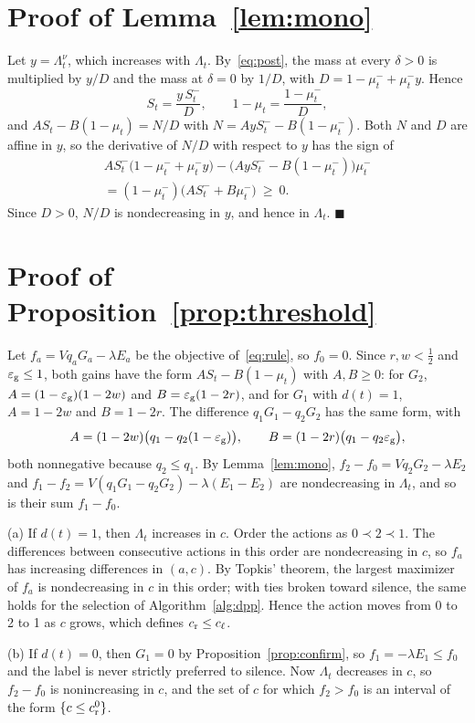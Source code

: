 \section{Proof of Lemma~\ref{lem:mono}}\label{app:mono}
Let $y=\Lambda_t^{\nu}$, which increases with $\Lambda_t$. By~\eqref{eq:post}, the mass at every $\delta>0$ is multiplied by $y/D$ and the mass at $\delta=0$ by $1/D$, with $D=1-\mu^-_t+\mu^-_ty$. Hence
\[
S_t=\frac{y\,S^-_t}{D},\qquad 1-\mu_t=\frac{1-\mu^-_t}{D},
\]
and $AS_t-B(1-\mu_t)=N/D$ with $N=AyS^-_t-B(1-\mu^-_t)$. Both $N$ and $D$ are affine in $y$, so the derivative of $N/D$ with respect to $y$ has the sign of
\begin{multline*}
AS^-_t\big(1-\mu^-_t+\mu^-_ty\big)-\big(AyS^-_t-B(1-\mu^-_t)\big)\mu^-_t\\
=(1-\mu^-_t)\big(AS^-_t+B\mu^-_t\big)\ \ge\ 0.
\end{multline*}
Since $D>0$, $N/D$ is nondecreasing in $y$, and hence in $\Lambda_t$. \hfill$\blacksquare$

\section{Proof of Proposition~\ref{prop:threshold}}\label{app:threshold}
Let $f_a=Vq_aG_a-\lambda E_a$ be the objective of~\eqref{eq:rule}, so $f_0=0$. Since $r,w<\frac12$ and $\varepsilon_{\rm g}\le1$, both gains have the form $AS_t-B(1-\mu_t)$ with $A,B\ge0$: for $G_2$, $A=(1-\varepsilon_{\rm g})(1-2w)$ and $B=\varepsilon_{\rm g}(1-2r)$, and for $G_1$ with $d(t)=1$, $A=1-2w$ and $B=1-2r$. The difference $q_1G_1-q_2G_2$ has the same form, with
\[
A=(1-2w)\big(q_1-q_2(1-\varepsilon_{\rm g})\big),\qquad B=(1-2r)\big(q_1-q_2\varepsilon_{\rm g}\big),
\]
both nonnegative because $q_2\le q_1$. By Lemma~\ref{lem:mono}, $f_2-f_0=Vq_2G_2-\lambda E_2$ and $f_1-f_2=V(q_1G_1-q_2G_2)-\lambda(E_1-E_2)$ are nondecreasing in $\Lambda_t$, and so is their sum $f_1-f_0$.

(a) If $d(t)=1$, then $\Lambda_t$ increases in $c$. Order the actions as $0\prec2\prec1$. The differences between consecutive actions in this order are nondecreasing in $c$, so $f_a$ has increasing differences in $(a,c)$. By Topkis' theorem, the largest maximizer of $f_a$ is nondecreasing in $c$ in this order; with ties broken toward silence, the same holds for the selection of Algorithm~\ref{alg:dpp}. Hence the action moves from 0 to 2 to 1 as $c$ grows, which defines $c_{\rm r}\le c_{\ell}$.

(b) If $d(t)=0$, then $G_1=0$ by Proposition~\ref{prop:confirm}, so $f_1=-\lambda E_1\le f_0$ and the label is never strictly preferred to silence. Now $\Lambda_t$ decreases in $c$, so $f_2-f_0$ is nonincreasing in $c$, and the set of $c$ for which $f_2>f_0$ is an interval of the form $\{c\le c^0_{\rm r}\}$.

